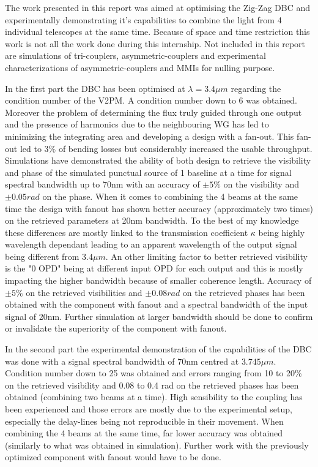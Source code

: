 The work presented in this report was aimed at optimising the Zig-Zag DBC and experimentally demonstrating it's capabilities to combine the light from 4 individual telescopes at the same time. Because of space and time restriction this work is not all the work done during this internship. Not included in this report are simulations of tri-couplers, asymmetric-couplers and experimental characterizations of asymmetric-couplers and MMIs for nulling purpose. 

In the first part the DBC has been optimised at $\lambda=3.4 \mu m $ regarding the condition number of the V2PM. A condition number down to 6 was obtained. Moreover the problem of determining the flux truly guided through one output and the presence of harmonics due to the neighbouring WG has led to minimizing the integrating area and developing a design with a fan-out. This fan-out led to 3\% of bending losses but considerably increased the usable throughput. 
Simulations have demonstrated the  ability of both design to retrieve the visibility and phase of the simulated punctual source of 1 baseline at a time for signal spectral bandwidth up to 70nm with an accuracy of $\pm 5\%$ on the visibility and $\pm 0.05 rad$ on the phase. When it comes to combining the 4 beams at the same time the design with fanout has shown better accuracy (approximately two times) on the retrieved parameters at 20nm bandwidth. To the best of my knowledge these differences are mostly linked to the transmission coefficient $\kappa$ being highly wavelength dependant leading to an apparent wavelength of the output signal being different from $3.4 \mu m$. An other limiting factor to better retrieved visibility is the "0 OPD" being at different input OPD for each output and this is mostly impacting the higher bandwidth because of smaller coherence length. Accuracy of $\pm 5\%$ on the retrieved visibilities and $\pm 0.08 rad$ on the retrieved phases has been obtained with the component with fanout and a spectral bandwidth of the input signal of 20nm. Further simulation at larger bandwidth should be done to confirm or invalidate the superiority of the component with fanout.

In the second part the experimental demonstration of the capabilities of the DBC was done with a signal spectral bandwidth of 70nm centred at $3.745 \mu m$. Condition number down to 25 was obtained and errors ranging from 10 to 20\% on the retrieved visibility and 0.08 to 0.4 rad on the retrieved phases has been obtained (combining two beams at a time). High sensibility to the coupling has been experienced and those errors are mostly due to the experimental setup, especially the delay-lines being not reproducible in their movement. When combining the 4 beams at the same time, far lower accuracy was obtained (similarly to what was obtained in simulation). Further work with the previously optimized component with fanout would have to be done.

